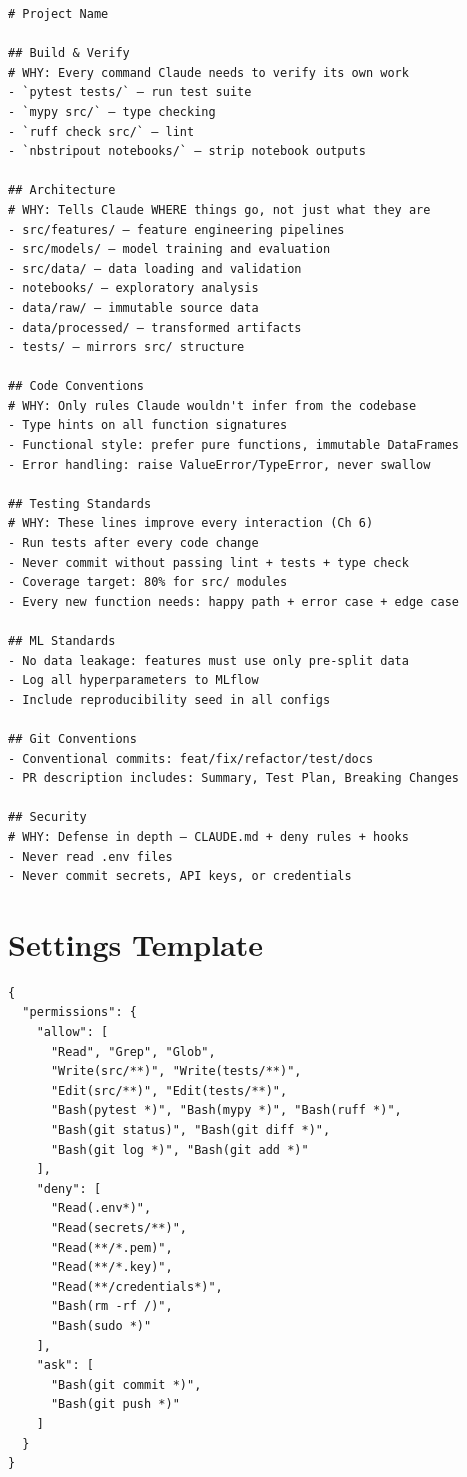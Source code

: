 \begin{verbatim}
# Project Name

## Build & Verify
# WHY: Every command Claude needs to verify its own work
- `pytest tests/` — run test suite
- `mypy src/` — type checking
- `ruff check src/` — lint
- `nbstripout notebooks/` — strip notebook outputs

## Architecture
# WHY: Tells Claude WHERE things go, not just what they are
- src/features/ — feature engineering pipelines
- src/models/ — model training and evaluation
- src/data/ — data loading and validation
- notebooks/ — exploratory analysis
- data/raw/ — immutable source data
- data/processed/ — transformed artifacts
- tests/ — mirrors src/ structure

## Code Conventions
# WHY: Only rules Claude wouldn't infer from the codebase
- Type hints on all function signatures
- Functional style: prefer pure functions, immutable DataFrames
- Error handling: raise ValueError/TypeError, never swallow

## Testing Standards
# WHY: These lines improve every interaction (Ch 6)
- Run tests after every code change
- Never commit without passing lint + tests + type check
- Coverage target: 80% for src/ modules
- Every new function needs: happy path + error case + edge case

## ML Standards
- No data leakage: features must use only pre-split data
- Log all hyperparameters to MLflow
- Include reproducibility seed in all configs

## Git Conventions
- Conventional commits: feat/fix/refactor/test/docs
- PR description includes: Summary, Test Plan, Breaking Changes

## Security
# WHY: Defense in depth — CLAUDE.md + deny rules + hooks
- Never read .env files
- Never commit secrets, API keys, or credentials
\end{verbatim}

\section{Settings Template}

\begin{verbatim}
{
  "permissions": {
    "allow": [
      "Read", "Grep", "Glob",
      "Write(src/**)", "Write(tests/**)",
      "Edit(src/**)", "Edit(tests/**)",
      "Bash(pytest *)", "Bash(mypy *)", "Bash(ruff *)",
      "Bash(git status)", "Bash(git diff *)",
      "Bash(git log *)", "Bash(git add *)"
    ],
    "deny": [
      "Read(.env*)",
      "Read(secrets/**)",
      "Read(**/*.pem)",
      "Read(**/*.key)",
      "Read(**/credentials*)",
      "Bash(rm -rf /)",
      "Bash(sudo *)"
    ],
    "ask": [
      "Bash(git commit *)",
      "Bash(git push *)"
    ]
  }
}
\end{verbatim}

